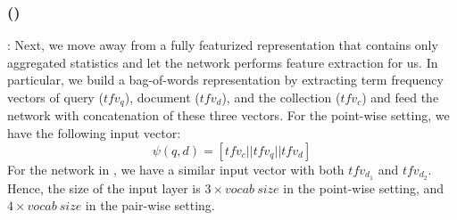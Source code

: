 \subsubsection{\Feedtwo (\ftwo)}: 
Next, we move away from a fully featurized representation that contains only aggregated statistics and let the network performs feature extraction for us. In particular, we build a bag-of-words representation by extracting term frequency vectors of query ($tfv_q$), document ($tfv_d$), and the collection ($tfv_c$) and feed the network with concatenation of these three vectors. For the point-wise setting, we have the following input vector:
\begin{equation}
\psi(q, d) = [tfv_c || tfv_q || tfv_d]
\end{equation}
For the network in \modelthree, we have a similar input vector with both $tfv_{d_1}$ and $tfv_{d_2}$. Hence, the size of the input layer is $3 \times vocab~size$ in the point-wise setting, and $4 \times vocab~size$ in the pair-wise setting. 

